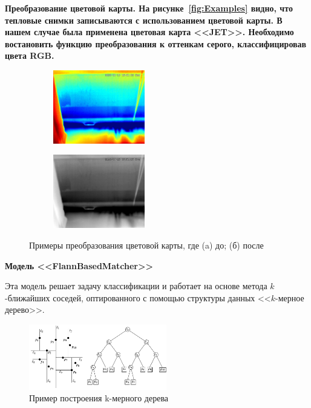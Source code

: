 \documentclass[t]{beamer}
\begin{document}
	\begin{frame}
		\bfseries Преобразование цветовой карты. \normalfont
		На рисунке~\ref{fig:Examples} видно, что тепловые снимки записываются с использованием цветовой карты.  В нашем случае была применена цветовая карта <<JET>>. Необходимо востановить функцию преобразования к оттенкам серого, классифицировав цвета RGB.
		\begin{figure}[ht!]
			\begin{subfigure}{.45\textwidth}
				\centering
				\includegraphics[width = 4cm]{image/chapter_2/tep_example}
				\caption{}
			\end{subfigure}
			\begin{subfigure}{.45\textwidth}
				\centering
				\includegraphics[width = 4cm]{image/chapter_2/gray_tep_example}
				\caption{}
			\end{subfigure}
			\centering
			\caption{Примеры преобразования цветовой карты, где (a) до; (б) после}
			\label{fig:ResKNN}
		\end{figure}
	\end{frame}

	\begin{frame}
		\textbf{Модель <<FlannBasedMatcher>>}
		
		Эта модель решает задачу классификации и работает на основе метода $k$-ближайших соседей, оптированного с помощью структуры данных <<$k$-мерное дерево>>.
		\begin{figure}[h!]
			\centering
			\includegraphics[width = 6cm]{image/chapter_2/kdtreeexample}	
			\caption{Пример построения k-мерного дерева}
			\label{fig:kdtreeexample}
		\end{figure}
	\end{frame}
	
\end{document}
